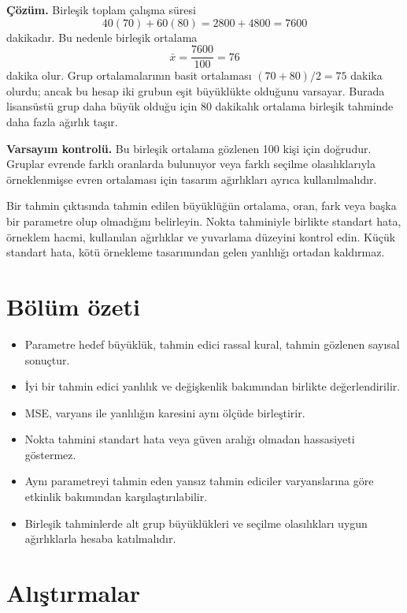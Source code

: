 \textbf{Çözüm.} Birleşik toplam çalışma süresi
\[
40(70)+60(80)=2800+4800=7600
\]
dakikadır. Bu nedenle birleşik ortalama
\[
\bar x=\frac{7600}{100}=76
\]
dakika olur. Grup ortalamalarının basit ortalaması $(70+80)/2=75$ dakika
olurdu; ancak bu hesap iki grubun eşit büyüklükte olduğunu varsayar. Burada
lisansüstü grup daha büyük olduğu için 80 dakikalık ortalama birleşik tahminde
daha fazla ağırlık taşır.

\textbf{Varsayım kontrolü.} Bu birleşik ortalama gözlenen 100 kişi için
doğrudur. Gruplar evrende farklı oranlarda bulunuyor veya farklı seçilme
olasılıklarıyla örneklenmişse evren ortalaması için tasarım ağırlıkları ayrıca
kullanılmalıdır.

\begin{outputguidebox}
Bir tahmin çıktısında tahmin edilen büyüklüğün ortalama, oran, fark veya başka
bir parametre olup olmadığını belirleyin. Nokta tahminiyle birlikte standart
hata, örneklem hacmi, kullanılan ağırlıklar ve yuvarlama düzeyini kontrol
edin. Küçük standart hata, kötü örnekleme tasarımından gelen yanlılığı ortadan
kaldırmaz.
\end{outputguidebox}





\section{Bölüm özeti}

\begin{itemize}
  \item Parametre hedef büyüklük, tahmin edici rassal kural, tahmin gözlenen sayısal sonuçtur.
  \item İyi bir tahmin edici yanlılık ve değişkenlik bakımından birlikte değerlendirilir.
  \item MSE, varyans ile yanlılığın karesini aynı ölçüde birleştirir.
  \item Nokta tahmini standart hata veya güven aralığı olmadan hassasiyeti göstermez.
  \item Aynı parametreyi tahmin eden yansız tahmin ediciler varyanslarına göre
  etkinlik bakımından karşılaştırılabilir.
  \item Birleşik tahminlerde alt grup büyüklükleri ve seçilme olasılıkları
  uygun ağırlıklarla hesaba katılmalıdır.
\end{itemize}

\section*{Alıştırmalar}

